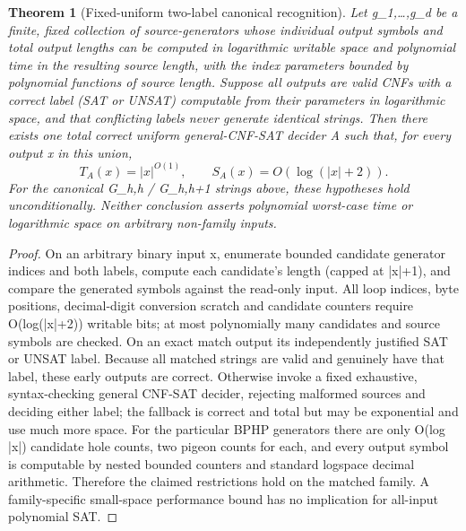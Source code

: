 \documentclass[11pt]{article}
\newtheorem{theorem}{Theorem}
\begin{document}
\begin{theorem}[Fixed-uniform two-label canonical recognition]
Let g_1,\ldots,g_d be a finite, \emph{fixed} collection of source-generators whose individual output symbols and total output lengths can be computed in logarithmic writable space and polynomial time in the resulting source length, with the index parameters bounded by polynomial functions of source length. Suppose all outputs are valid CNFs with a correct label (SAT or UNSAT) computable from their parameters in logarithmic space, and that conflicting labels never generate identical strings. Then there exists one total correct uniform general-CNF-SAT decider A such that, for every output x in this union,
\[
T_A(x)=|x|^{O(1)},\qquad S_A(x)=O(\log(|x|+2)).
\]
For the canonical G_{h,h} / G_{h,h+1} strings above, these hypotheses hold unconditionally. Neither conclusion asserts polynomial worst-case time or logarithmic space on arbitrary non-family inputs.
\end{theorem}
\begin{proof}
On an arbitrary binary input x, enumerate bounded candidate generator indices and both labels, compute each candidate's length (capped at |x|+1), and compare the generated symbols against the read-only input. All loop indices, byte positions, decimal-digit conversion scratch and candidate counters require O(log(|x|+2)) writable bits; at most polynomially many candidates and source symbols are checked. On an exact match output its independently justified SAT or UNSAT label. Because all matched strings are valid and genuinely have that label, these early outputs are correct. Otherwise invoke a fixed exhaustive, syntax-checking general CNF-SAT decider, rejecting malformed sources and deciding either label; the fallback is correct and total but may be exponential and use much more space. For the particular BPHP generators there are only O(log |x|) candidate hole counts, two pigeon counts for each, and every output symbol is computable by nested bounded counters and standard logspace decimal arithmetic. Therefore the claimed restrictions hold on the matched family. A family-specific small-space performance bound has no implication for all-input polynomial SAT.
\end{proof}
\end{document}
